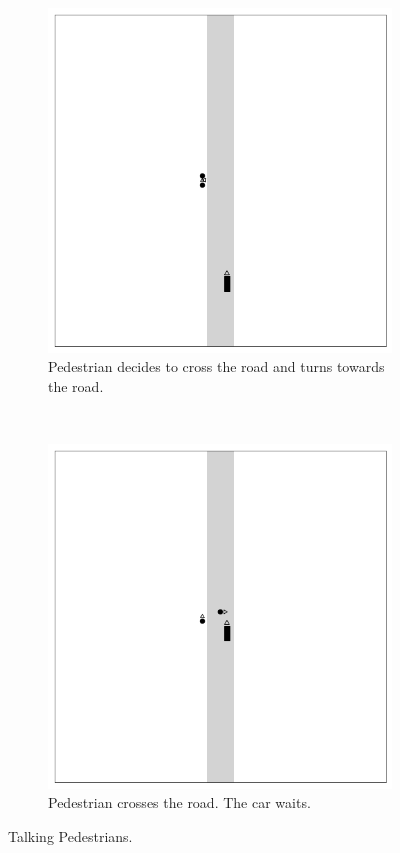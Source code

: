 \documentclass[a4paper]{article}
\begin{document}
\begin{figure}[htb]
\begin{subfigure}[t]{0.3\textwidth}
        \includegraphics[width=\textwidth]{figures/talking_pedestrians_2.png}
        \caption{Pedestrian decides to cross the road and turns towards the road.}
    \end{subfigure}
    ~
    \begin{subfigure}[t]{0.3\textwidth}
        \centering
        \includegraphics[width=\textwidth]{figures/talking_pedestrians_3.png}
        \caption{Pedestrian crosses the road. The car waits.}
    \end{subfigure}
    \caption{Talking Pedestrians.}
\end{figure}
\end{document}
